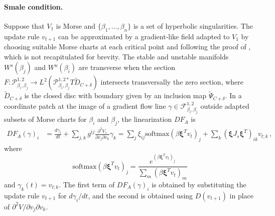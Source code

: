 \documentclass[12pt]{article}
\begin{document}
\paragraph{Smale condition.}
Suppose that $V_1$ is Morse and $\{\beta_1,...,\beta_n\}$ is a set of hyperbolic singularities. The update rule $v_{t+1}$ can be approximated by a gradient-like field adapted to $V_1$ by choosing suitable Morse charts at each critical point and following the proof of , which is not recapitulated for brevity. The stable and unstable manifolds $W^s(\beta_j)$ and $W^u(\beta_i)$ are transverse when the section $F: \mathcal{P}_{\beta_{i},\beta_{j}}^{1,2} \rightarrow L^2(\mathcal{P}_{\beta_{i},\beta_{j}}^{1,2*}T\tilde{D}_{C+\delta})$ intersects transversally the zero section, where $\tilde{D}_{C+\delta}$ is the closed disc with boundary given by an inclusion map $\tilde{\Psi}_{C+\delta}$. In a coordinate patch at the image of a gradient flow line $\gamma \in \mathcal{F}^{1,2}_{\beta_{i}, \beta_{j}}$ outside adapted subsets of Morse charts for $\beta_{i}$ and $\beta_{j}$, the linearization $DF_A$ is 
\begin{align*}
    DF_A(\gamma)_i &= \frac{d\gamma_i}{dt} + \sum_{j,k} g^{ij} \frac{\partial^2 V_1}{\partial v_j \partial v_k} \gamma_k = \sum_j \xi_{ij} \text{softmax}\left(  \beta \bm{\xi}^T v_t\right)_j + \sum_{k} \left(\bm{\xi} J_s \bm{\xi}^T \right)_{ik} v_{t;k} \,,
\end{align*}
where
\begin{equation*}
    \text{softmax}\left(  \beta \bm{\xi}^T v_t\right)_j = \frac{e^{\left(  \beta \bm{\xi}^T v_t\right)_j}}{\sum_m \left(  \beta \bm{\xi}^T v_t\right)_m} \,
\end{equation*}
and $\gamma_k(t) = v_{t;k}$. The first term of $DF_A(\gamma)_i$ is obtained by substituting the update rule $v_{t+1}$ for $d\gamma_i/dt$, and the second is obtained using $D(v_{t+1})$ in place of $\partial^2V/\partial v_j \partial v_k$.
\end{document}
